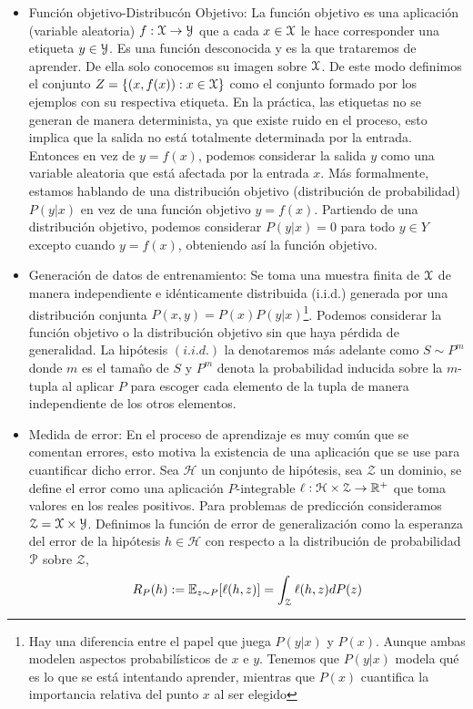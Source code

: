 \begin{itemize}
        \item Función objetivo-Distribucón Objetivo: La función objetivo es una aplicación (variable aleatoria) $f:\mathcal{X} \to \mathcal{Y}$ que a cada $x\in \mathcal{X}$ le hace corresponder una etiqueta $y \in \mathcal{Y}$. Es una función desconocida y es la que trataremos de aprender. De ella solo conocemos su imagen sobre $\mathcal{X}$. De este modo definimos el conjunto ${Z = \{ (x,f(x)): x \in \mathcal{X}\}}$ como el conjunto formado por los ejemplos con su respectiva etiqueta. En la práctica, las etiquetas no se generan de manera determinista, ya que existe ruido en el proceso, esto implica que la salida no está totalmente determinada por la entrada. Entonces en vez de $y = f(x)$, podemos considerar la salida $y$ como una variable aleatoria que está afectada por la entrada $x$. Más formalmente, estamos hablando de una distribución objetivo (distribución de probabilidad) $P(y|x)$ en vez de una función objetivo $y = f(x)$. Partiendo de una distribución objetivo, podemos considerar $P(y|x) = 0$ para todo $y\in Y$ excepto cuando $y=f(x)$, obteniendo así la función objetivo. 
        
        \item Generación de datos de entrenamiento: Se toma una muestra finita de $\mathcal{X}$ de manera independiente e idénticamente distribuida (i.i.d.) generada por una distribución conjunta $P(x,y) = P(x)P(y|x)$\footnote{Hay una diferencia entre el papel que juega $P(y|x)$ y $P(x)$. Aunque ambas modelen aspectos probabilísticos de $x$ e $y$. Tenemos que $P(y|x)$ modela qué es lo que se está intentando aprender, mientras que $P(x)$ cuantifica la importancia relativa del punto $x$ al ser elegido}. Podemos considerar la función objetivo o la distribución objetivo sin que haya pérdida de generalidad. La hipótesis $(i.i.d.)$ la denotaremos más adelante como $S\sim P^m$ donde $m$ es el tamaño de $S$ y $P^m$ denota la probabilidad inducida sobre la $m$-tupla al aplicar $P$ para escoger cada elemento de la tupla de manera independiente de los otros elementos. \\ 
        
      
        \item Medida de error: En el proceso de aprendizaje es muy común que se comentan errores, esto motiva la existencia de una aplicación que se use para cuantificar dicho error. Sea $\mathcal{H}$ un conjunto de hipótesis, sea $\mathcal{Z}$ un dominio, se define el error como una aplicación $P$-integrable $\ell: \mathcal{H} \times \mathcal{Z} \to \mathbb{R}^{+}$ que toma valores en los reales positivos. Para problemas de predicción consideramos $\mathcal{Z} = \mathcal{X} \times \mathcal{Y}$. Definimos la función de error de generalización como la esperanza del error de la hipótesis $h\in \mathcal{H}$ con respecto a la distribución de probabilidad $\mathcal{P}$ sobre $\mathcal{Z}$,
        \begin{equation}\label{eq:general_loss_function}
            R_{P}(h) := \mathbb{E}_{z\sim P} [\ell(h,z)] = \int_{\mathcal{Z}} \ell(h,z) dP(z)
        \end{equation}
    \end{itemize}
    
